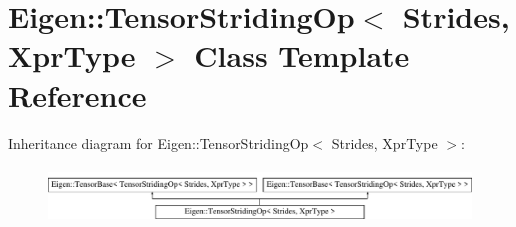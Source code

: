 \hypertarget{class_eigen_1_1_tensor_striding_op}{}\section{Eigen\+:\+:Tensor\+Striding\+Op$<$ Strides, Xpr\+Type $>$ Class Template Reference}
\label{class_eigen_1_1_tensor_striding_op}
Inheritance diagram for Eigen\+:\+:Tensor\+Striding\+Op$<$ Strides, Xpr\+Type $>$\+:\begin{figure}[H]
\begin{center}
\leavevmode
\includegraphics[height=1.517615cm]{class_eigen_1_1_tensor_striding_op}
\end{center}
\end{figure}
